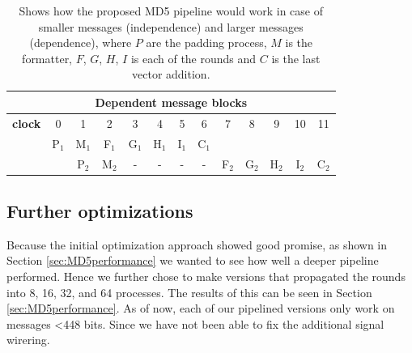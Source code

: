 \documentclass[a4paper, openany]{book}
\begin{document}
\begin{table}[H]
\captionsetup{width=.8\linewidth}
\centering
{}
\newline
\vspace*{0.5cm}
\newline
\centering
\begin{tabular}{c c c c c c c c c c c c c}
\hline
\multicolumn{13}{c}{Dependent message blocks}\\
\hline
\textbf{clock} & 0   &  1  &  2  &  3  &  4   & 5 &  6 &     7 &    8  & 9   &    10  &    11\\
\hline
               & P$_1$ & M$_1$ & F$_1$ & G$_1$ & H$_1$  & I$_1$ & C$_1$ &     &        &         &       &     \\
               &       & P$_2$ & M$_2$ &   -   &   -    &   -    &   -   & F$_2$ & G$_2$ & H$_2$  & I$_2$ & C$_2$ \\
\end{tabular}
\caption[MD5 pipeline]%
{Shows how the proposed MD5 pipeline would work in case of smaller messages (independence) and larger messages (dependence), where $P$ are the padding process, $M$ is the formatter, $F$, $G$, $H$, $I$ is each of the rounds and $C$ is the last vector addition.}
\label{tab:MD5pipeline}
\end{table}

\subsection{Further optimizations}
\label{sec:orgd5fda55}
Because the initial optimization approach showed good promise, as shown in Section \ref{sec:MD5performance} we wanted to see how well a deeper pipeline performed. Hence we further chose to make versions that propagated the rounds into 8, 16, 32, and 64 processes. The results of this can be seen in Section \ref{sec:MD5performance}. As of now, each of our pipelined versions only work on messages <448 bits. Since we have not been able to fix the additional signal wirering.
\end{document}
